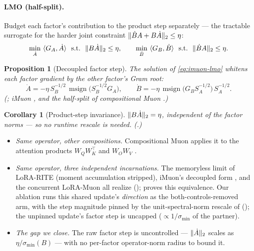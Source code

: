 \documentclass[11pt]{article}
\DeclarePairedDelimiter{\norm}{\lVert}{\rVert}
\DeclareMathOperator{\polar}{msign}          %
\theoremstyle{plain}
\newtheorem{proposition}{Proposition}
\newtheorem{corollary}{Corollary}
\theoremstyle{definition}
\theoremstyle{remark}
\begin{document}
\paragraph{LMO (half-split).} Budget each factor's contribution to the product step separately --- the tractable surrogate \cite{tilde_csd} for the harder joint constraint $\norm{\dot B A+B\dot A}_2\le\eta$:
\begin{equation}
  \min_{\dot A}\ \langle G_A,\dot A\rangle \ \ \text{s.t.}\ \ \norm{B\dot A}_2\le\eta,
  \qquad
  \min_{\dot B}\ \langle G_B,\dot B\rangle \ \ \text{s.t.}\ \ \norm{\dot B A}_2\le\eta .
  \label{eq:imuon-lmo}
\end{equation}
\begin{proposition}[Decoupled factor step]\label{prop:imuon}
The solution of \eqref{eq:imuon-lmo} whitens each factor gradient by the other factor's Gram root:
\begin{equation*}
  \dot A=-\eta\,S_B^{-1/2}\,\polar\!\big(S_B^{-1/2}G_A\big),\qquad
  \dot B=-\eta\,\polar\!\big(G_B S_A^{-1/2}\big)\,S_A^{-1/2}.
\end{equation*}
\emph{(; iMuon \cite{imuon}, and the half-split of compositional Muon \cite{tilde_csd}.)}
\end{proposition}
\begin{corollary}[Product-step invariance]\label{cor:imuon}
$\norm{B\dot A}_2=\eta$, independent of the factor norms --- so no runtime rescale is needed. \emph{(.)}
\end{corollary}
\begin{itemize}[leftmargin=1.5em,itemsep=1pt,topsep=2pt]
  \item \emph{Same operator, other compositions.} Compositional Muon applies it to the attention products $W_QW_K^\top$ and $W_OW_V$ \cite{tilde_csd}.
  \item \emph{Same operator, three independent incarnations.} The memoryless limit of LoRA-RITE \cite{lorarite} (moment accumulation stripped), iMuon's decoupled form \cite{imuon}, and the concurrent LoRA-Muon \cite{loramuon} all realize  (); \cite{loramuon} proves this equivalence. Our ablation runs this shared update's \emph{direction} as the both-controls-removed arm, with the step magnitude pinned by the unit-spectral-norm rescale of  (); the unpinned update's factor step is uncapped ($\propto1/\sigma_{\min}$ of the partner).
  \item \emph{The gap we close.} The raw factor step is uncontrolled --- $\norm{\dot A}_2$ scales as $\eta/\sigma_{\min}(B)$ --- with no per-factor operator-norm radius to bound it.
\end{itemize}
\end{document}
